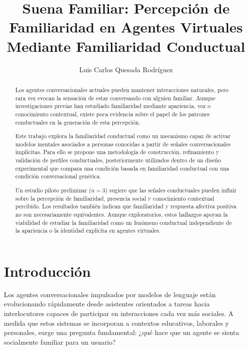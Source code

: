 \documentclass[sigconf, nonacm, language=spanish]{acmart}
\begin{document}
\title[Suena Familiar]{Suena Familiar: Percepción de Familiaridad en Agentes Virtuales Mediante Familiaridad Conductual}

\author{Luis Carlos Quesada Rodríguez}

\begin{abstract}
  Los agentes conversacionales actuales pueden mantener interacciones naturales, pero rara vez evocan la sensación de estar conversando con alguien familiar. Aunque investigaciones previas han estudiado familiaridad mediante apariencia, voz o conocimiento contextual, existe poca evidencia sobre el papel de los patrones conductuales en la generación de esta percepción.

Este trabajo explora la familiaridad conductual como un mecanismo capaz de activar modelos mentales asociados a personas conocidas a partir de señales conversacionales implícitas. Para ello se propone una metodología de construcción, refinamiento y validación de perfiles conductuales, posteriormente utilizados dentro de un diseño experimental que compara una condición basada en familiaridad conductual con una condición conversacional genérica.

Un estudio piloto preliminar ($n=3$) sugiere que las señales conductuales pueden influir sobre la percepción de familiaridad, presencia social y conocimiento contextual percibido. Los resultados también indican que familiaridad y respuesta afectiva positiva no son necesariamente equivalentes. Aunque exploratorios, estos hallazgos apoyan la viabilidad de estudiar la familiaridad como un fenómeno conductual independiente de la apariencia o la identidad explícita en agentes virtuales.

    
\end{abstract}


\maketitle

\section{Introducción}

Los agentes conversacionales impulsados por modelos de lenguaje están evolucionando rápidamente desde asistentes orientados a tareas hacia interlocutores capaces de participar en interacciones cada vez más sociales. A medida que estos sistemas se incorporan a contextos educativos, laborales y personales, surge una pregunta fundamental: ¿qué hace que un agente se sienta socialmente familiar para un usuario?
\end{document}
